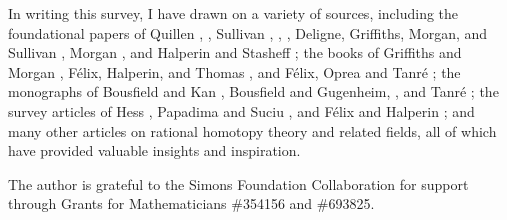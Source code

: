 \documentclass{article}
\numberwithin{equation}{section}
\theoremstyle{definition}
\begin{document}
\begin{ack}
In  writing this survey, I have drawn on a variety of sources, 
including the foundational papers of  Quillen \cite{Qu68}, \cite{Qu69}, 
Sullivan  \cite{Sullivan74}, \cite{Sullivan77}, \cite{Sullivan05},
Deligne, Griffiths, Morgan, and Sullivan \cite{DGMS}, 
Morgan \cite{Mo}, and Halperin and Stasheff \cite{HS79};
the books of Griffiths and Morgan \cite{GM13}, 
F\'elix, Halperin, and Thomas \cite{FHT}, \cite{FHT2} and 
Félix, Oprea and Tanr\'e \cite{FOT}; 
the monographs of Bousfield and Kan \cite{BK72}, 
Bousfield and Gugenheim, \cite{BG76}, and 
Tanr\'e \cite{Tanre};
the survey articles of Hess \cite{Hess}, 
Papadima and Suciu \cite{PS-formal}, and 
F\'elix and Halperin \cite{FH17}; 
and many other articles on rational homotopy theory and 
related fields, all of which have provided valuable insights and inspiration.
\end{ack}

\begin{funding}
The author is grateful to the Simons Foundation Collaboration for support 
through Grants for Mathematicians \#354156 and \#693825.
\end{funding}

\end{document}
